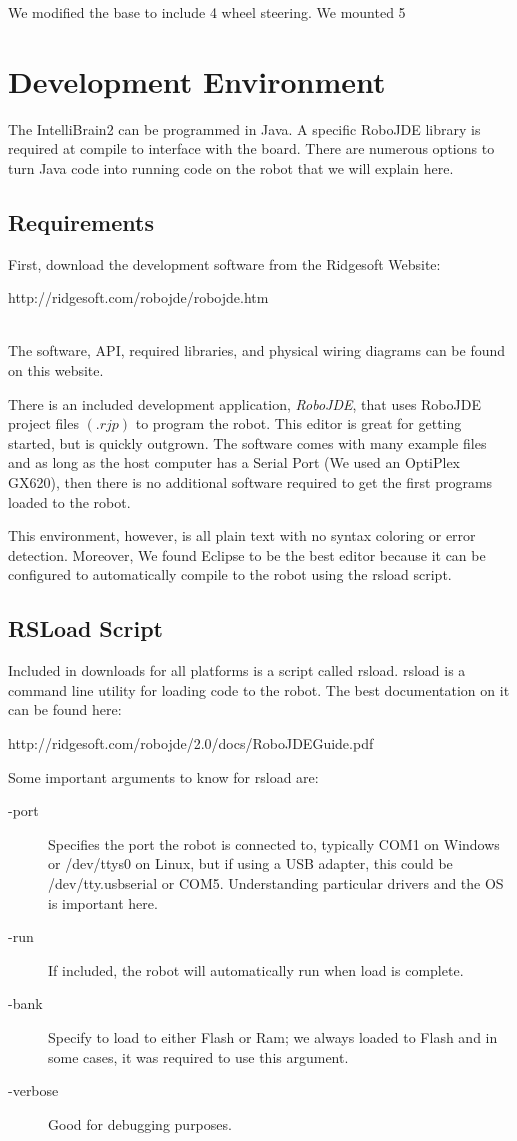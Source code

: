 \documentclass[12pt]{article}
\begin{document}
We modified the base to include 4 wheel steering.  We mounted 5 
\clearpage
\section{Development Environment}
The IntelliBrain2 can be programmed in Java.  A specific RoboJDE library is required at compile to interface with the board.  There are numerous options to turn Java code into running code on the robot that we will explain here.
\subsection{Requirements}
First, download the development software from the Ridgesoft Website:\\
{\color{blue}\centerline{http://ridgesoft.com/robojde/robojde.htm}}\\
The software, API, required libraries, and physical wiring diagrams can be found on this website.

There is an included development application, \textit{RoboJDE}, that uses RoboJDE project files $(.rjp)$ to program the robot.  This editor is great for getting started, but is quickly outgrown.  The software comes with many example files and as long as the host computer has a Serial Port (We used an OptiPlex GX620), then there is no additional software required to get the first programs loaded to the robot.

This environment, however, is all plain text with no syntax coloring or error detection.  Moreover, We found Eclipse to be the best editor because it can be configured to automatically compile to the robot using the rsload script.

\subsection{RSLoad Script}
Included in downloads for all platforms is a script called rsload.  rsload is a command line utility for loading code to the robot.  The best documentation on it can be found here:\\
{\color{blue}\centerline{http://ridgesoft.com/robojde/2.0/docs/RoboJDEGuide.pdf}}
Some important arguments to know for rsload are:
\begin{description}

\item[-port] Specifies the port the robot is connected to, typically COM1 on Windows or /dev/ttys0 on Linux, but if using a USB adapter, this could be /dev/tty.usbserial or COM5.  Understanding particular drivers and the OS is important here.
\item[-run] If included, the robot will automatically run when load is complete.
\item[-bank] Specify to load to either Flash or Ram; we always loaded to Flash and in some cases, it was required to use this argument.
\item[-verbose] Good for debugging purposes.
\end{description}
\end{document}
